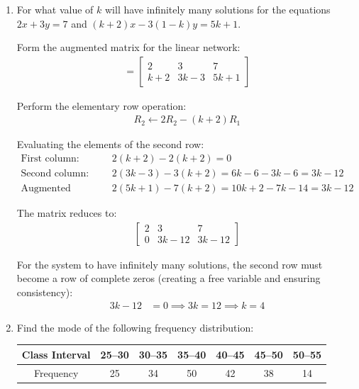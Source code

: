 \begin{enumerate}[label=\thesubsection.\arabic*, ref=\thesubsection.\theenumi]
	Therefore, the 21st term of the A.P. is:
	\begin{align*}
		a_{21} = \frac{51}{2} \quad \left(\text{or } 25\frac{1}{2}\right)
	\end{align*}	
 
	\item For what value of $k$ will  have infinitely many solutions for the equations $2x+3y=7$ and $(k+2)x-3(1-k)y=5k+1$.
	
	\solution
	
	Form the augmented matrix for the linear network:
	\begin{align*}
		[\mathbf{A} \mid \mathbf{b}] = \left[\begin{array}{cc|c} 2 & 3 & 7 \\ k+2 & 3k-3 & 5k+1 \end{array}\right]
	\end{align*}
	
	Perform the elementary row operation:
	\begin{align*}
		R_2 \leftarrow 2R_2 - (k+2)R_1
	\end{align*}
	
	Evaluating the elements of the second row:
	\begin{align*}
		\text{First column: } & 2(k+2) - 2(k+2) = 0 \\
		\text{Second column: } & 2(3k-3) - 3(k+2) = 6k - 6 - 3k - 6 = 3k - 12 \\
		\text{Augmented column: } & 2(5k+1) - 7(k+2) = 10k + 2 - 7k - 14 = 3k - 12
	\end{align*}
	
	The matrix reduces to:
	\begin{align*}
		\left[\begin{array}{cc|c} 2 & 3 & 7 \\ 0 & 3k-12 & 3k-12 \end{array}\right]
	\end{align*}
	
	For the system to have infinitely many solutions, the second row must become a row of complete zeros (creating a free variable and ensuring consistency):
	\begin{align*}
		3k - 12 &= 0 \implies 3k = 12 \implies k = 4
	\end{align*}
	
	

	\item  Find the mode of the following frequency distribution:
	
	\begin{center}
		\begin{tabular}{|c|c|c|c|c|c|c|}
			\hline
			Class Interval & 25--30 & 30--35 & 35--40 &
			40--45 & 45--50 & 50--55\\
			\hline
			Frequency & 25 & 34 & 50 & 42 & 38 & 14\\
			\hline
		\end{tabular}
	\end{center}
	

\end{enumerate}
